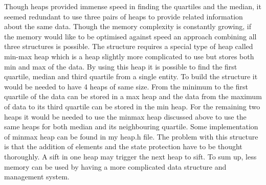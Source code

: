 \documentclass[a4paper, 12pt, titlepage]{article}
\begin{document}
Though heaps provided immense speed in finding the quartiles and the median, it seemed redundant to use three pairs of heaps to provide related information about the same data. Though the memory complexity is constantly growing, if the memory would like to be optimised against speed an approach combining all three structures is possible. The structure requires a special type of heap called min-max heap which is a heap slightly more complicated to use but stores both min and max of the data. By using this heap it is possible to find the first quartile, median and third quartile from a single entity. To build the structure it would be needed to have 4 heaps of same size. From the minimum to the first quartile of the data can be stored in a max heap and the data from the maximum of data to its third quartile can be stored in the min heap. For the remaining two heaps it would be needed to use the minmax heap discussed above to use the same heaps for both median and its neighbouring quartile. Some implementation of minmax heap can be found in my heap.h file. The problem with this structure is that the addition of elements and the state protection have to be thought thoroughly. A sift in one heap may trigger the next heap to sift. To sum up, less memory can be used by having a more complicated data structure and management system.
\end{document}
